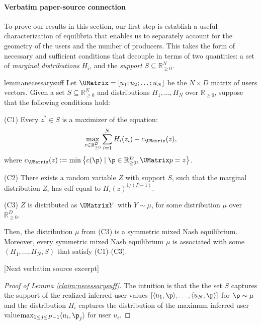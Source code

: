 \documentclass[10pt]{article}
\begin{document}
\paragraph{Verbatim paper-source connection}
\begin{ReviewVerbatim}
To prove our results in this section, our first step is establish a useful characterization of equilibria that enables us to separately account for the geometry of the users and the number of producers. This takes the form of necessary and sufficient conditions that decouple in terms of two quantities: a set of \textit{marginal distributions} $H_i$,
and the \textit{support} $S \subseteq \mathbb{R}_{\ge 0}^N$.
\begin{restatable}{lemma}{necessarysuff}
\label{claim:necessarysuff}
Let $\UMatrix = [u_1; u_2; \ldots; u_N]$ be the $N \times D$ matrix of users vectors. Given a set $S \subseteq \mathbb{R}_{\ge 0}^N$ and distributions $H_1, \ldots, H_N$ over $\mathbb{R}_{\ge 0}$, suppose that the following conditions hold:
\begin{description}
    \item{(C1)} Every $z^* \in S$ is a maximizer of the equation:
    \begin{equation}
\label{eq:reparam}
 \max_{z \in \mathbb{R}_{\ge 0}^D} \sum_{i=1}^N H_i(z_i) - c_{\UMatrix}(z),
\end{equation}
where $c_{\UMatrix}(z) := \min \left\{c(\p) \mid \p \in \mathbb{R}_{\ge 0}^D, \UMatrix p=z  \right\}$.
    \item{(C2)} There exists a random variable $Z$ with support $S$, such that the marginal distribution $Z_i$ has cdf equal to $H_i(z)^{1/(P-1)}$.
    \item{(C3)} $Z$ is distributed as $\UMatrix Y$ with $Y \sim \mu$, for some distribution $\mu$ over $\mathbb{R}_{\ge 0}^D$.
\end{description}
Then, the distribution $\mu$ from (C3) is a symmetric mixed Nash equilibrium. Moreover, every symmetric mixed Nash equilibrium $\mu$ is associated with some $(H_1, \ldots, H_N, S)$ that satisfy (C1)-(C3).
\end{restatable}

[Next verbatim source excerpt]

\begin{proof}[Proof of Lemma \ref{claim:necessarysuff}]
The intuition is that the the set $S$ captures the support of the realized inferred user values $[\langle u_1, \p \rangle, \ldots, \langle u_N, \p \rangle]$ for $\p \sim \mu$ and the distribution $H_i$ captures the distribution of the maximum inferred user value$\max_{1 \le j \le P -1} \langle u_i, \p_j\rangle$ for user $u_i$.


\end{proof}
\end{ReviewVerbatim}
\end{document}
